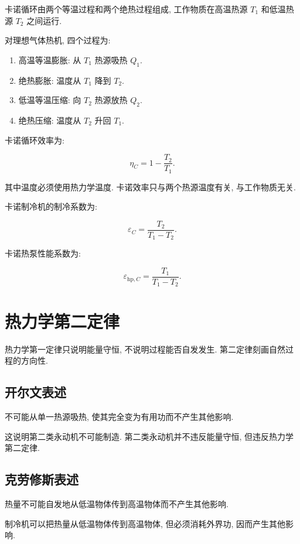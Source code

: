 \documentclass[
  a4paper,
]{ctexrep}
\providecommand{\tightlist}{%
  \setlength{\itemsep}{0pt}\setlength{\parskip}{0pt}}
\begin{document}
卡诺循环由两个等温过程和两个绝热过程组成, 工作物质在高温热源 \(T_1\)
和低温热源 \(T_2\) 之间运行.

对理想气体热机, 四个过程为:

\begin{enumerate}
\def\labelenumi{\arabic{enumi}.}
\tightlist
\item
  高温等温膨胀: 从 \(T_1\) 热源吸热 \(Q_1\).
\item
  绝热膨胀: 温度从 \(T_1\) 降到 \(T_2\).
\item
  低温等温压缩: 向 \(T_2\) 热源放热 \(Q_2\).
\item
  绝热压缩: 温度从 \(T_2\) 升回 \(T_1\).
\end{enumerate}

卡诺循环效率为:

\[
\eta_C=1-\frac{T_2}{T_1}.
\]

其中温度必须使用热力学温度. 卡诺效率只与两个热源温度有关,
与工作物质无关.

卡诺制冷机的制冷系数为:

\[
\varepsilon_C=\frac{T_2}{T_1-T_2}.
\]

卡诺热泵性能系数为:

\[
\varepsilon_{\mathrm{hp},C}=\frac{T_1}{T_1-T_2}.
\]

\section{热力学第二定律}\label{ux70edux529bux5b66ux7b2cux4e8cux5b9aux5f8b}

热力学第一定律只说明能量守恒, 不说明过程能否自发发生.
第二定律刻画自然过程的方向性.

\subsection{开尔文表述}\label{ux5f00ux5c14ux6587ux8868ux8ff0}

不可能从单一热源吸热, 使其完全变为有用功而不产生其他影响.

这说明第二类永动机不可能制造. 第二类永动机并不违反能量守恒,
但违反热力学第二定律.

\subsection{克劳修斯表述}\label{ux514bux52b3ux4feeux65afux8868ux8ff0}

热量不可能自发地从低温物体传到高温物体而不产生其他影响.

制冷机可以把热量从低温物体传到高温物体, 但必须消耗外界功,
因而产生其他影响.
\end{document}
